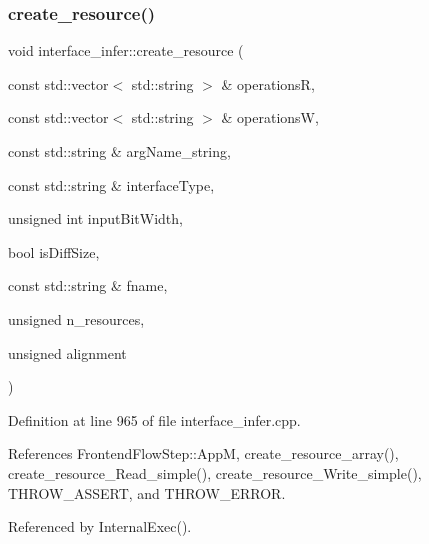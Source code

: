 \subsubsection{\texorpdfstring{create\+\_\+resource()}{create\_resource()}}
{\footnotesize\ttfamily void interface\+\_\+infer\+::create\+\_\+resource (\begin{DoxyParamCaption}\item[{const std\+::vector$<$ std\+::string $>$ \&}]{operationsR,  }\item[{const std\+::vector$<$ std\+::string $>$ \&}]{operationsW,  }\item[{const std\+::string \&}]{arg\+Name\+\_\+string,  }\item[{const std\+::string \&}]{interface\+Type,  }\item[{unsigned int}]{input\+Bit\+Width,  }\item[{bool}]{is\+Diff\+Size,  }\item[{const std\+::string \&}]{fname,  }\item[{unsigned}]{n\+\_\+resources,  }\item[{unsigned}]{alignment }\end{DoxyParamCaption})\hspace{0.3cm}{\ttfamily [private]}}



Definition at line 965 of file interface\+\_\+infer.\+cpp.



References Frontend\+Flow\+Step\+::\+AppM, create\+\_\+resource\+\_\+array(), create\+\_\+resource\+\_\+\+Read\+\_\+simple(), create\+\_\+resource\+\_\+\+Write\+\_\+simple(), T\+H\+R\+O\+W\+\_\+\+A\+S\+S\+E\+RT, and T\+H\+R\+O\+W\+\_\+\+E\+R\+R\+OR.



Referenced by Internal\+Exec().

